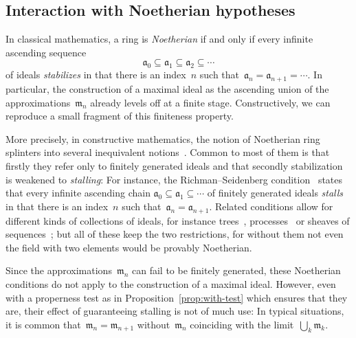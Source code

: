 \documentclass[com,11pt,crcready]{iosart2x}
\theoremstyle{definition}
\theoremstyle{plain}
\theoremstyle{remark}
\newcommand{\?}{\,{:}\,}
\newcommand{\aaa}{\mathfrak{a}}
\newcommand{\mmm}{\mathfrak{m}}
\renewcommand{\_}{\mathpunct{.}\,}
\begin{document}
\subsection{Interaction with Noetherian hypotheses}

In classical mathematics, a ring is \emph{Noetherian} if and only if every
infinite ascending sequence
\[ \aaa_0 \subseteq \aaa_1 \subseteq \aaa_2 \subseteq \cdots \]
of ideals \emph{stabilizes} in that there is an index~$n$ such that~$\aaa_n =
\aaa_{n+1} = \cdots$. In particular, the construction of a maximal ideal as the
ascending union of the approximations~$\mmm_n$ already levels off at a finite
stage. Constructively, we can reproduce a small fragment of this
finiteness property.

More precisely, in constructive mathematics, the notion of Noetherian ring
splinters into several inequivalent notions~\cite{richman:noetherian,mines-richman-ruitenburg:constructive-algebra,perdry:noetherian,perdry:lazy,perdry-schuster:noetherian,schuster-zappe:noetherian,coquand-lombardi:krull,coquand:invariant,tennenbaum:hilbert,seidenberg:noether,jacobsson-lofwall:standard}. Common to most of them
is that firstly they refer only to finitely generated ideals and that secondly
stabilization is weakened to \emph{stalling}: For instance, the Richman--Seidenberg
condition~\cite[Section~III.2]{mines-richman-ruitenburg:constructive-algebra}
states that every infinite ascending chain
$\aaa_0 \subseteq \aaa_1 \subseteq \cdots$ of finitely generated ideals
\emph{stalls} in that there is an index~$n$ such that~$\aaa_n = \aaa_{n+1}$.
Related conditions allow for different kinds of collections of ideals, for
instance trees~\cite{richman:noetherian}, processes~\cite[Section~3.9]{blechschmidt:phd} or
sheaves of sequences~\cite{coquand-lombardi:krull,coquand:invariant,blechschmidt:multiverse};
but all of these keep the two restrictions, for without them not
even the field with two elements would be provably Noetherian.

Since the approximations~$\mmm_n$ can fail to be finitely generated, these
Noetherian conditions do not apply to the construction of a maximal ideal.
However, even with a properness test as in Proposition~\ref{prop:with-test}
which ensures that they are, their effect of guaranteeing stalling is not of
much use: In typical situations, it is common that~$\mmm_n = \mmm_{n+1}$
without~$\mmm_n$ coinciding with the limit~$\bigcup_k \mmm_k$.
\end{document}
